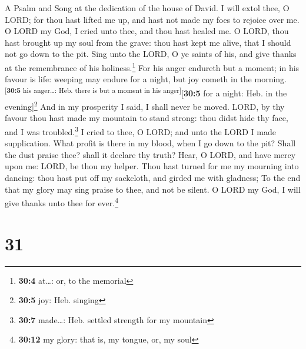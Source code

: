 A Psalm and Song at the dedication of the house of David. 
I will extol thee, O LORD; for thou hast lifted me up, and hast not made
my foes to rejoice over me.  O LORD my God, I cried unto
thee, and thou hast healed me.  O LORD, thou hast brought
up my soul from the grave: thou hast kept me alive, that I should not go
down to the pit.  Sing unto the LORD, O ye saints of his,
and give thanks at the remembrance of his holiness.\footnote{\textbf{30:4}
  at\ldots: or, to the memorial}  For his anger endureth
but a moment; in his favour is life: weeping may endure for a night, but
joy cometh in the morning.\textsuperscript{{[}\textbf{30:5} his
anger\ldots: Heb. there is but a moment in his anger{]}}{[}\textbf{30:5}
for a night: Heb. in the evening{]}\footnote{\textbf{30:5} joy: Heb.
  singing}  And in my prosperity I said, I shall never be
moved.  LORD, by thy favour thou hast made my mountain to
stand strong: thou didst hide thy face, and I was troubled.\footnote{\textbf{30:7}
  made\ldots: Heb. settled strength for my mountain}  I
cried to thee, O LORD; and unto the LORD I made supplication.
 What profit is there in my blood, when I go down to the
pit? Shall the dust praise thee? shall it declare thy truth?
 Hear, O LORD, and have mercy upon me: LORD, be thou my
helper.  Thou hast turned for me my mourning into
dancing: thou hast put off my sackcloth, and girded me with gladness;
 To the end that my glory may sing praise to thee, and
not be silent. O LORD my God, I will give thanks unto thee for
ever.\footnote{\textbf{30:12} my glory: that is, my tongue, or, my soul}

\hypertarget{section-30}{%
\section{31}\label{section-30}}

